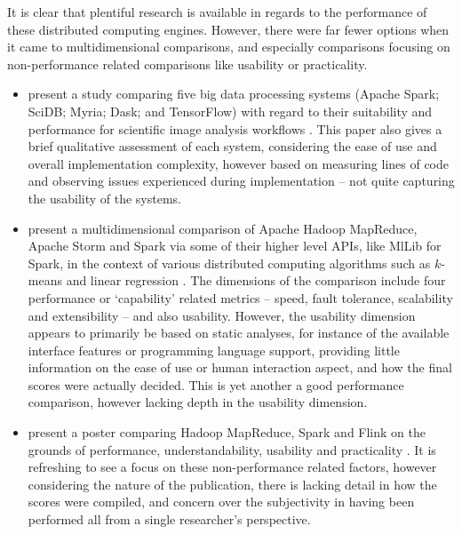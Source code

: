   It is clear that plentiful research is available in regards to the performance of these distributed computing engines. However, there were far fewer options when it came to multidimensional comparisons, and especially comparisons focusing on non-performance related comparisons like usability or practicality.

  \begin{itemize}
    \item \citeauthor{MEHTA:COMP_EVAL_BIGDATA_SYS:2017} present a study comparing five big data processing systems (Apache Spark; SciDB; Myria; Dask; and TensorFlow) with regard to their suitability and performance for scientific image analysis workflows \cite{MEHTA:COMP_EVAL_BIGDATA_SYS:2017}. This paper also gives a brief qualitative assessment of each system, considering the ease of use and overall implementation complexity, however based on measuring lines of code and observing issues experienced during implementation -- not quite capturing the usability of the systems.
    \item \citeauthor{RICHTER:COMPARISON:2015} present a multidimensional comparison of Apache Hadoop MapReduce, Apache Storm and Spark via some of their higher level APIs, like MlLib for Spark, in the context of various distributed computing algorithms such as $k$-means and linear regression \cite{RICHTER:COMPARISON:2015}. The dimensions of the comparison include four performance or `capability' related metrics -- speed, fault tolerance, scalability and extensibility -- and also usability. However, the usability dimension appears to primarily be based on static analyses, for instance of the available interface features or programming language support, providing little information on the ease of use or human interaction aspect, and how the final scores were actually decided. This is yet another a good performance comparison, however lacking depth in the usability dimension.
    \item \citeauthor{GALILEE:COMPARISON:2014} present a poster comparing Hadoop MapReduce, Spark and Flink on the grounds of performance, understandability, usability and practicality \cite{GALILEE:COMPARISON:2014}. It is refreshing to see a focus on these non-performance related factors, however considering the nature of the publication, there is lacking detail in how the scores were compiled, and concern over the subjectivity in having been performed all from a single researcher's perspective.
  \end{itemize}


